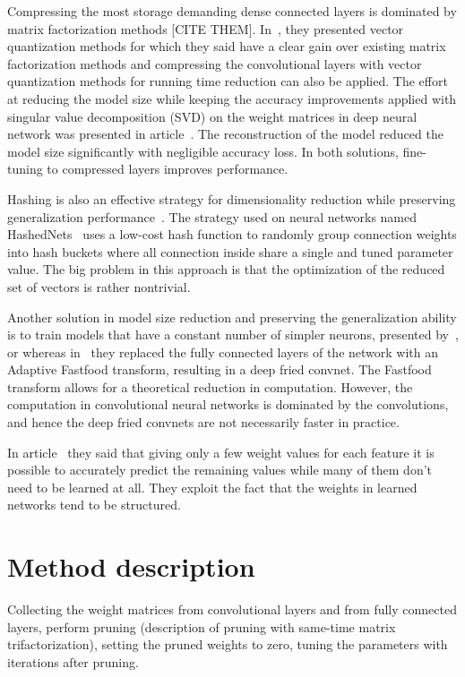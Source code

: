 \documentclass{article} %
\begin{document}
Compressing the most storage demanding dense connected layers is dominated by matrix factorization methods [CITE THEM]. In~\cite{ DBLP:journals/corr/GongLYB14}, they presented vector quantization methods for which they said have a clear gain over existing matrix factorization methods and compressing the convolutional layers with vector quantization methods for running time reduction can also be applied. The effort at reducing the model size while keeping the accuracy improvements applied with singular value decomposition (SVD) on the weight matrices in deep neural network was presented in article~\cite{xue2013restructuring}. The reconstruction of the model reduced the model size significantly with negligible accuracy loss. In both solutions, fine-tuning to compressed layers improves performance. 

Hashing is also an effective strategy for dimensionality reduction while preserving generalization performance~\cite{weinberger2009feature, shi2009hash}. The strategy used on neural networks named HashedNets~\cite{chen2015compressing} uses a low-cost hash function to randomly group connection weights into hash buckets where all connection inside share a single and tuned parameter value. The big problem in this approach is that the optimization of the reduced set of vectors is rather nontrivial. 

Another solution in model size reduction and preserving the generalization ability is to train models that have a constant number of simpler neurons, presented by~\cite{collins2014memory}, or whereas in~\cite{yang2014deep} they replaced the fully connected layers of the network with an Adaptive Fastfood transform, resulting in a deep fried convnet. The Fastfood transform allows for a theoretical reduction in computation. However, the computation in convolutional neural networks is dominated by the convolutions, and hence the deep fried convnets are not necessarily faster in practice. 

In article~\cite{denil2013predicting} they said that giving only a few weight values for each feature it is possible to accurately predict the remaining values while many of them don’t need to be learned at all. They exploit the fact that the weights in learned networks tend to be structured.



\section{Method description}
Collecting the weight matrices from convolutional layers and from fully connected layers, perform pruning (description of pruning with same-time matrix trifactorization), setting the pruned weights to zero, tuning the parameters with iterations after pruning.
\end{document}
